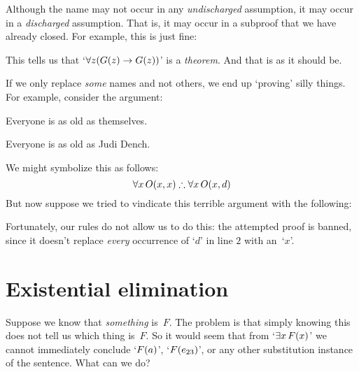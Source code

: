 Although the name may not occur in any \emph{undischarged} assumption, it may occur in a \emph{discharged} assumption. That is, it may occur in a subproof that we have already closed. For example, this is just fine:
\begin{fitchproof}
	\open
		\AS
	\close
\end{fitchproof}
This tells us that `$\forall z (G(z) \rightarrow G(z))$' is a \emph{theorem}. And that is as it should be.

If we only replace \emph{some} names and not others, we end up
`proving' silly things. For example, consider the argument:
	\begin{earg}
	\item Everyone is as old as themselves.
	\item[\texttherefore] Everyone is as old as Judi Dench.
	\end{earg}
We might symbolize this as follows:
$$\forall x\,\atom{O}{x,x} \therefore \forall x\,\atom{O}{x,d}$$
But now suppose we tried to vindicate this terrible argument with the following:
\begin{fitchproof}
	\PR
\end{fitchproof}
Fortunately, our rules do not allow us to do this: the attempted proof
is banned, since it doesn't replace \emph{every} occurrence of `$d$'
in line $2$ with an~`$x$'.

\section{Existential elimination}\label{s:existsElim}

Suppose we know that \emph{something} is~$F$. The problem is that simply knowing this does not tell us which thing is~$F$. So it would seem that from `$\exists x\,F(x)$' we cannot immediately conclude `$F(a)$', `$F(e_{23})$', or any other substitution instance of the sentence. What can we do?

